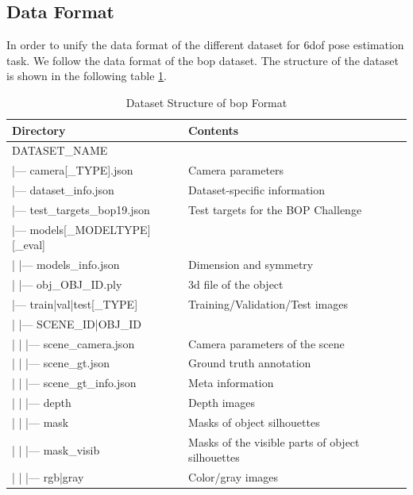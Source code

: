 \documentclass[12pt,DIV14,BCOR12mm,a4paper,footinclude=false,headinclude,parskip=half-,twoside,openright,cleardoublepage=empty,toc=index,bibliography=totoc,listof=totoc]{scrreprt}
\numberwithin{equation}{chapter}
\begin{document}
\subsection{Data Format}
In order to unify the data format of the different dataset for \gls{6dof} pose estimation task. We follow the data format of the \gls{bop} dataset. The structure of the dataset is shown in the following table \ref{tab:dataset}.
\begin{table}[ht]
  \centering
  \caption{Dataset Structure of \gls{bop} Format}
  \label{tab:dataset}
  \begin{tabular}{l l}
      \toprule
      Directory & Contents \\
      \midrule
      DATASET\_NAME & \\
      |--- camera[\_TYPE].json & Camera parameters\\
      |--- dataset\_info.json & Dataset-specific information\\
      |--- test\_targets\_bop19.json & Test targets for the BOP Challenge \\
      |--- models[\_MODELTYPE][\_eval] & \\
      | \quad |--- models\_info.json & Dimension and symmetry\\
      | \quad |--- obj\_OBJ\_ID.ply & \gls{3d} file of the object\\
      |--- train|val|test[\_TYPE] & Training/Validation/Test images\\
      | \quad |--- SCENE\_ID|OBJ\_ID & \\
      | \quad | \quad |--- scene\_camera.json & Camera parameters of the scene\\
      | \quad | \quad |--- scene\_gt.json & Ground truth annotation\\
      | \quad | \quad |--- scene\_gt\_info.json & Meta information\\
      | \quad | \quad |--- depth & Depth images\\
      | \quad | \quad |--- mask & Masks of object silhouettes\\
      | \quad | \quad |--- mask\_visib & Masks of the visible parts of object silhouettes\\
      | \quad | \quad |--- rgb|gray & Color/gray images\\
      \bottomrule
  \end{tabular}
\end{table}
\end{document}
